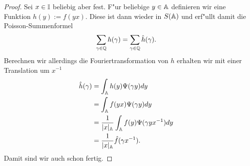 	\begin{proof}
		Sei $x \in \mathbb{I}$ beliebig aber fest. 
		F"ur beliebige $y \in \mathbb{A}$ definieren wir eine Funktion $h(y):=f(yx)$. Diese ist dann wieder in $S(\mathbb{A})$ und erf"ullt damit die Poisson-Summenformel
		\begin{align*}
			\sum_{\gamma \in \mathbb{Q}}h(\gamma) = \sum_{\gamma \in \mathbb{Q}} \hat{h}(\gamma).
		\end{align*}
		Berechnen wir allerdings die Fouriertransformation von $h$ erhalten wir mit einer Translation um $x^{-1}$
		\begin{align*}
			\hat{h}(\gamma) &= \int_{\mathbb{A}}h(y)\Psi(\gamma y)dy \\
							 &= \int_{\mathbb{A}}f(yx)\Psi(\gamma y)dy \\
							 &= \frac{1}{|x|_{\mathbb{A}}} \int_{\mathbb{A}}f(y)\Psi(\gamma y x^{-1})dy \\
							 &= \frac{1}{|x|_{\mathbb{A}}} \hat{f}(\gamma x^{-1}).
		\end{align*}
		Damit sind wir auch schon fertig.
	\end{proof}
	
